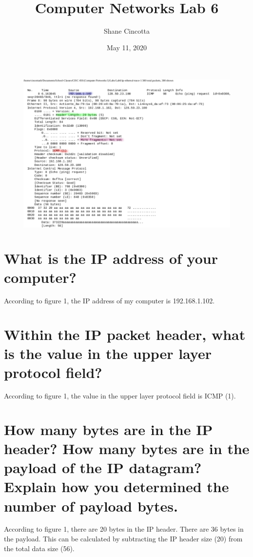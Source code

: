 \documentclass{article}
\title{Computer Networks Lab 6}
\author{Shane Cincotta }
\date{May 11, 2020}
\begin{document}
\maketitle
\begin{figure}[h!]
\centering
\includegraphics[scale=0.65]{Q1-4.pdf}
\caption{}
\end{figure}

\section*{What is the IP address of your computer?}
According to figure 1, the IP address of my computer is 192.168.1.102.\\

\section*{Within the IP packet header, what is the value in the upper layer protocol field?}
According to figure 1, the value in the upper layer protocol field is ICMP (1).\\

\section*{How many bytes are in the IP header? How many bytes are in the payload of the
IP datagram? Explain how you determined the number of payload bytes.}
According to figure 1, there are 20 bytes in the IP header.  There are 36 bytes in the payload.  This can be calculated by subtracting the IP header size (20) from the total data size (56).\\
\end{document}
